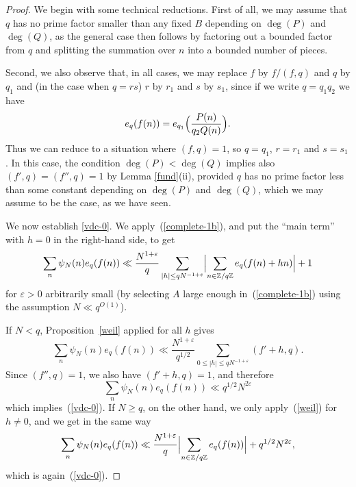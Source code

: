 \documentclass[12pt,a4paper,reqno]{amsart}
\numberwithin{equation}{section}
\theoremstyle{plain}
\theoremstyle{definition}
\newcommand\Z{\mathbb{Z}}
\newcommand\eps{\varepsilon}
\renewcommand{\lessapprox}{\llcurly}
\newcommand{\onef}{\mathbf{1}}
\begin{document}
\begin{proof} 
We begin with some technical reductions.  First of all, we may assume
that $q$ has no prime factor smaller than any fixed $B$ depending on
$\deg(P)$ and $\deg(Q)$, as the general case then follows by factoring out a bounded factor from $q$ and splitting the summation over $n$ into a bounded number of pieces.

Second, we also observe that, in all cases, we may replace $f$ by
$f/(f,q)$ and $q$ by $q_1$ and (in the case when $q=rs$) $r$ by $r_1$
and $s$ by $s_1$, since if we write $q=q_1q_2$ we have
$$
e_q(f(n))=e_{q_1}\Bigl(\frac{P(n)}{q_2Q(n)}\Bigr).
$$
Thus we can reduce to a situation where $(f,q)=1$, so $q=q_1$, $r=r_1$
and $s=s_1$. In this case, the condition $\deg(P)<\deg(Q)$ implies
also $(f',q)=(f'',q)=1$ by Lemma \ref{fund}(ii), provided $q$ has no
prime factor less than some constant depending on $\deg(P)$ and
$\deg(Q)$, which we may assume to be the case, as we have seen.

We now establish \eqref{vdc-0}.  We apply~(\ref{complete-1b}), and put
the ``main term'' with $h=0$ in the right-hand side, to get
$$
\sum_n \psi_N(n) e_q(f(n)) \ll \frac{N^{1+\eps}}{q} \sum_{|h|\leq
  qN^{-1+\eps}}\Bigl|\sum_{n \in \Z/q\Z} e_q(f(n) + hn)\Bigr| + 1
$$
for $\eps>0$ arbitrarily small (by selecting $A$ large enough
in~(\ref{complete-1b}) using the assumption $N\ll q^{O(1)}$).

If $N<q$, Proposition~\ref{weil} applied for all $h$ gives
$$
\sum_n \psi_N(n) e_q(f(n)) \ll \frac{N^{1+\eps}}{q^{1/2}}
\sum_{0\leq |h|\leq qN^{-1+\eps}}(f'+h,q).
$$
Since $(f'',q)=1$, we also have $(f'+h,q)=1$, and therefore
$$
\sum_n \psi_N(n) e_q(f(n)) \ll q^{1/2}N^{2\eps}
$$
which implies~(\ref{vdc-0}).  If $N\geq q$, on the other hand, we only
apply~(\ref{weil}) for $h \neq 0$, and we get in the same way
$$
\sum_n \psi_N(n) e_q(f(n)) \ll \frac{N^{1+\eps}}{q}
\Bigl|\sum_{n\in\Z/q\Z}e_q(f(n))\Bigr|+ q^{1/2}N^{2\eps},
$$
which is again~(\ref{vdc-0}).



\end{proof}
\end{document}
